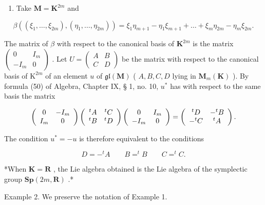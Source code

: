 \begin{enumerate}
\def\labelenumi{(\alph{enumi})}
\setcounter{enumi}{1}
\tightlist
\item
  Take \(\mathbf{M} = \mathbf{K}^{2m}\) and
\end{enumerate}

\[
\beta ((\xi_ {1}, \dots , \xi_ {2 m}), (\eta_ {1}, \dots , \eta_ {2 m})) = \xi_ {1} \eta_ {m + 1} - \eta_ {1} \xi_ {m + 1} + \dots + \xi_ {m} \eta_ {2 m} - \eta_ {m} \xi_ {2 m}.
\]

The matrix of \(\beta\) with respect to the canonical basis of \(\mathbf{K}^{2m}\) is the matrix \(\left( \begin{array}{cc}0 & I_m\\ -I_m & 0 \end{array} \right)\) . Let \(U = \left( \begin{array}{cc}A & B\\ C & D \end{array} \right)\) be the matrix with respect to the canonical basis of \(\mathrm{K}^{2m}\) of an element \(u\) of \(\mathfrak{gl}(\mathbf{M})\) ( \(A,B,C,D\) lying in \(\mathbf{M}_m(\mathbf{K})\) ). By formula (50) of Algebra, Chapter IX, § 1, no. 10, \(u^*\) has with respect to the same basis the matrix

\[
\left( \begin{array}{c c} 0 & - I _ {m} \\ I _ {m} & 0 \end{array} \right) \left( \begin{array}{c c} ^ {t} A & ^ {t} C \\ ^ {t} B & ^ {t} D \end{array} \right) \left( \begin{array}{c c} 0 & I _ {m} \\ - I _ {m} & 0 \end{array} \right) = \left( \begin{array}{c c} ^ {t} D & - ^ {t} B \\ - ^ {t} C & ^ {t} A \end{array} \right).
\]

The condition \(u^{*} = -u\) is therefore equivalent to the conditions

\[
D = - ^ {t} A \qquad B = ^ {t} B \qquad C = ^ {t} C.
\]

*When \(\mathbf{K} = \mathbf{R}\) , the Lie algebra obtained is the Lie algebra of the symplectic group \(\mathbf{Sp}(2m, \mathbf{R})\) .*

Example 2. We preserve the notation of Example 1.

